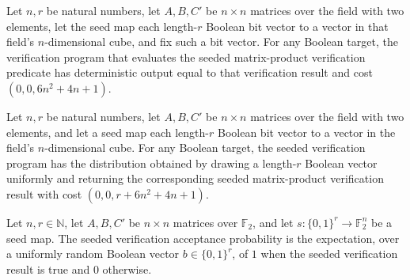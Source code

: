 \begin{theorem}
\label{FABL.runWithCost_seededMatrixProductVerificationAfterSeed}
\leanok
{}
Let $n,r$ be natural numbers, let $A,B,C'$ be $n\times n$ matrices over the field with
two elements, let the seed map each length-$r$ Boolean bit vector to a vector in that
field’s $n$-dimensional cube, and fix such a bit vector. For any Boolean target, the
verification program that evaluates the seeded matrix-product verification predicate has
deterministic output equal to that verification result and cost $(0,0,6n^2+4n+1)$.
\end{theorem}

\begin{theorem}
\label{FABL.runWithCost_seededMatrixProductVerificationProgram}
\leanok
{}
Let $n,r$ be natural numbers, let $A,B,C'$ be $n\times n$ matrices over the field with
two elements, and let a seed map each length-$r$ Boolean bit vector to a vector in the
field’s $n$-dimensional cube. For any Boolean target, the seeded verification program
has the distribution obtained by drawing a length-$r$ Boolean vector uniformly and
returning the corresponding seeded matrix-product verification result with cost
$(0,0,r+6n^2+4n+1)$.
\end{theorem}

\begin{definition}
\label{FABL.seededMatrixProductVerificationAcceptanceProbability}
\leanok
{}
Let $n,r\in\mathbb{N}$, let $A,B,C'$ be $n\times n$ matrices over $\mathbb{F}_2$, and
let $s:\{0,1\}^r\to\mathbb{F}_2^n$ be a seed map. The seeded verification acceptance
probability is the expectation, over a uniformly random Boolean vector $b\in\{0,1\}^r$,
of $1$ when the seeded verification result is true and $0$ otherwise.
\end{definition}

